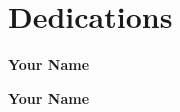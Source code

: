 \chapter*{Dedications}

\vfill
\hfill
\textbf{\LARGE Your Name}

\newpage

\vfill
\hfill
\textbf{\LARGE Your Name}
